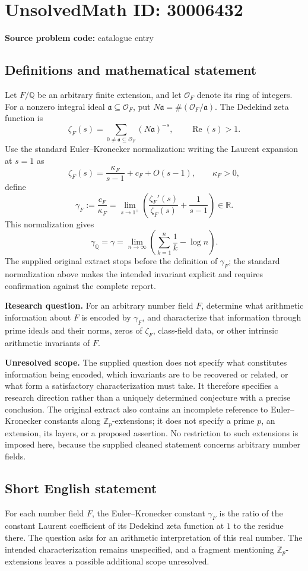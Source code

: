 \documentclass[11pt]{article}
\newcommand{\Z}{\mathbb{Z}}
\newcommand{\Q}{\mathbb{Q}}
\newcommand{\R}{\mathbb{R}}
\begin{document}
\section*{UnsolvedMath ID: 30006432}
\textbf{Source problem code:} catalogue entry
\subsection{Definitions and mathematical statement}
Let \(F/\Q\) be an arbitrary finite extension, and let \(\mathcal O_F\) denote its ring of integers. For a nonzero integral ideal \(\mathfrak a\subseteq\mathcal O_F\), put \(N\mathfrak a=\#(\mathcal O_F/\mathfrak a)\). The Dedekind zeta function is
\[
\zeta_F(s)=\sum_{0\ne\mathfrak a\subseteq\mathcal O_F}(N\mathfrak a)^{-s},\qquad \operatorname{Re}(s)>1.
\]
Use the standard Euler--Kronecker normalization: writing the Laurent expansion at \(s=1\) as
\[
\zeta_F(s)=\frac{\kappa_F}{s-1}+c_F+O(s-1),\qquad \kappa_F>0,
\]
define
\[
\gamma_F:=\frac{c_F}{\kappa_F}
=\lim_{s\to1^+}\left(\frac{\zeta_F'(s)}{\zeta_F(s)}+\frac{1}{s-1}\right)\in\R.
\]
This normalization gives
\[
\gamma_{\Q}=\gamma
=\lim_{n\to\infty}\left(\sum_{k=1}^{n}\frac1k-\log n\right).
\]
The supplied original extract stops before the definition of \(\gamma_F\); the standard normalization above makes the intended invariant explicit and requires confirmation against the complete report.

\textbf{Research question.} For an arbitrary number field \(F\), determine what arithmetic information about \(F\) is encoded by \(\gamma_F\), and characterize that information through prime ideals and their norms, zeros of \(\zeta_F\), class-field data, or other intrinsic arithmetic invariants of \(F\).

\textbf{Unresolved scope.} The supplied question does not specify what constitutes information being encoded, which invariants are to be recovered or related, or what form a satisfactory characterization must take. It therefore specifies a research direction rather than a uniquely determined conjecture with a precise conclusion. The original extract also contains an incomplete reference to Euler--Kronecker constants along \(\Z_p\)-extensions; it does not specify a prime \(p\), an extension, its layers, or a proposed assertion. No restriction to such extensions is imposed here, because the supplied cleaned statement concerns arbitrary number fields.
\subsection{Short English statement}
For each number field \(F\), the Euler--Kronecker constant \(\gamma_F\) is the ratio of the constant Laurent coefficient of its Dedekind zeta function at \(1\) to the residue there. The question asks for an arithmetic interpretation of this real number. The intended characterization remains unspecified, and a fragment mentioning \(\Z_p\)-extensions leaves a possible additional scope unresolved.
\end{document}
